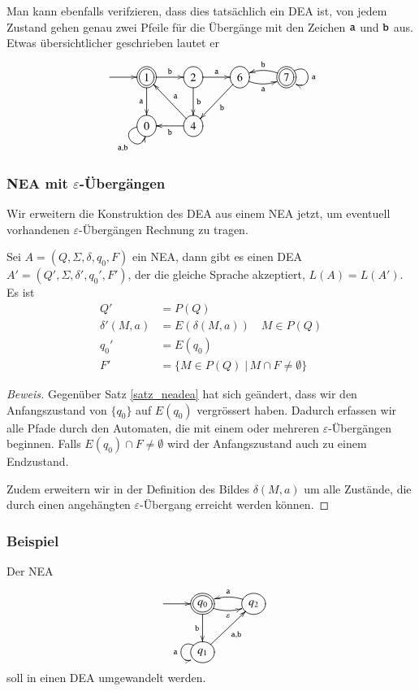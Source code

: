 Man kann ebenfalls verifzieren, dass dies tatsächlich ein DEA ist, 
von jedem Zustand gehen genau zwei Pfeile für die Übergänge mit
den Zeichen ${\tt a}$ und ${\tt b}$ aus.
Etwas übersichtlicher geschrieben lautet er
\[
\entrymodifiers={++[o][F]}
\xymatrix{
*+\txt{}\ar[r]
	&*++[o][F=]{1}\ar[r]^{\tt b} \ar[d]_{\tt a}
		&2 \ar[r]^{\tt a} \ar[d]^{\tt b}
			&6\ar@/_/[r]_{\tt a} \ar[dl]^{\tt b}
				&*++[o][F=]{7}\ar@/_/[l]_{\tt b} \ar@(ur,dr)^{\tt a}
\\
*+\txt{}
	&0 \ar@(l,d)_{{\tt a},{\tt b}}
		&4 \ar[ul]_{\tt a} \ar[l]^{\tt b}
}
\]

\subsubsection{NEA mit $\varepsilon$-Übergängen}
Wir erweitern die Konstruktion des DEA aus einem NEA jetzt, um eventuell
vorhandenen $\varepsilon$-Übergängen Rechnung zu tragen.

\begin{satz}
\label{satz_neadea}
Sei $A=(Q,\Sigma,\delta,q_0,F)$ ein NEA, dann gibt es einen
DEA $A'=(Q',\Sigma,\delta',q_0',F')$, der die gleiche Sprache
akzeptiert, $L(A)=L(A')$.
Es ist
\begin{align*}
Q'&=P(Q)\\
\delta'(M,a)&=E(\delta(M, a))\quad M\in P(Q)\\
q_0'&=E(q_0)\\
F'&=\{M\in P(Q)\;|\, M\cap F\ne \emptyset\}
\end{align*}
\end{satz}

\begin{proof}[Beweis]
Gegenüber Satz \ref{satz_neadea} hat sich geändert, dass wir den
Anfangszustand von $\{q_0\}$ auf $E(q_0)$ vergrössert haben.
Dadurch erfassen wir alle Pfade durch den Automaten, die mit einem oder
mehreren $\varepsilon$-Übergängen beginnen.
Falls $E(q_0)\cap F\ne \emptyset$
wird der Anfangszustand auch zu einem Endzustand.

Zudem erweitern wir in der Definition des Bildes $\delta(M,a)$ um alle Zustände,
die durch einen angehängten $\varepsilon$-Übergang erreicht werden
können.
\end{proof}

\subsubsection{Beispiel}
Der NEA 
\[
\entrymodifiers={++[o][F]}
\xymatrix{
*+\txt{}\ar[r]
	&*++[o][F=]{q_0} \ar[d]_{\tt b} \ar@/_/[r]_{\varepsilon}
		&{q_2}\ar@/_/[l]_{\tt a}
\\
*+\txt{}
	&{q_1}\ar[ur]_{{\tt a},{\tt b}} \ar@(ul,dl)_{\tt a}
}
\]
soll in einen DEA umgewandelt werden.

